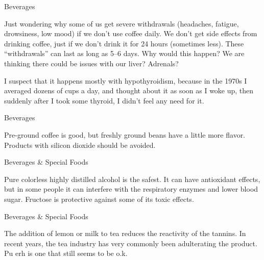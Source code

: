 \documentclass[11pt,oneside,openany,extrafontsizes]{memoir}
\begin{document}
\begin{qaexchange}{Beverages}

    \begin{question}
        Just wondering why some of us get severe withdrawals (headaches, fatigue, drowsiness, low mood) if we don't use coffee daily. We don't get side effects from drinking coffee, just if we don't drink it for 24 hours (sometimes less). These \enquote{withdrawals} can last as long as 5--6 days. Why would this happen? We are thinking there could be issues with our liver? Adrenals?
    \end{question}

    \begin{answer}
        I suspect that it happens mostly with hypothyroidism, because in the 1970s I averaged dozens of cups a day, and thought about it as soon as I woke up, then suddenly after I took some thyroid, I didn't feel any need for it.
    \end{answer}
\end{qaexchange}

\begin{standalonequote}{Beverages}

    \begin{answer}
        Pre-ground coffee is good, but freshly ground beans have a little more flavor. Products with silicon dioxide should be avoided.
    \end{answer}
\end{standalonequote}

\begin{standalonequote}{Beverages \& Special Foods}

    \begin{answer}
      Pure colorless highly distilled alcohol is the safest. It can have antioxidant effects, but in some people it can interfere with the respiratory enzymes and lower blood sugar. Fructose is protective against some of its toxic effects.
    \end{answer}
\end{standalonequote}

\begin{standalonequote}{Beverages \& Special Foods}

    \begin{answer}
      The addition of lemon or milk to tea reduces the reactivity of the tannins. In recent years, the tea industry has very commonly been adulterating the product. Pu erh is one that still seems to be o.k.
    \end{answer}
\end{standalonequote}
\end{document}
